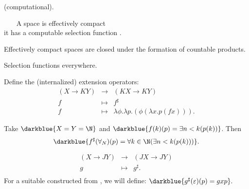 \documentclass%
[%
Screen4to3,
]{foils}
\begin{document}
  (computational).

~~~ A space  is effectively compact \darkgreen{$\iff$} \\
\phantom{xxx}it has a computable selection function .

\vfill




Effectively compact spaces are closed under the formation of countable products.

\vfill


\vfill




\vfill

\begin{center}
\Huge Selection functions everywhere.
\end{center}

\vfill



Define the (internalized) extension operators:
\begin{eqnarray*}
  (X \to K Y) & \to & (KX \to KY) \\
    f & \mapsto & f^\sharp \\
    f & \mapsto & \lambda \phi.\lambda p.(\phi(\lambda x.p(f x))). 
\end{eqnarray*}

\vfill

 Take $\darkblue{X=Y=\N}$ and $\darkblue{f(k)(p) = \exists n < k(p(k))}$. 
Then 
\[
\darkblue{f^\sharp(\forall_N)(p) = \forall k \in \N(\exists n < k(p(k)))}.
\]



\begin{eqnarray*}
  (X \to J Y) & \to & (JX \to JY) \\
   g & \mapsto & g^\sharp. \\
\end{eqnarray*}
For a suitable  constructed from \darkblue{$\varepsilon$}, we will define:
$
\darkblue{g^\sharp(\varepsilon)(p) = g x p}.
$
\end{document}
